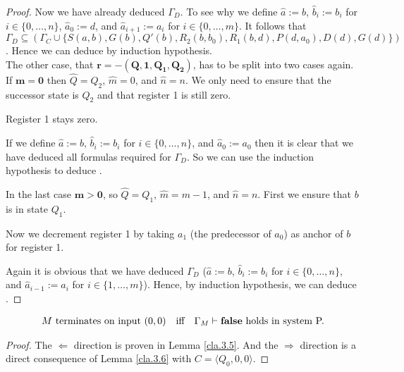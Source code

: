 \begin{proof}
	Now we have already deduced $\Gamma_D$. To see why we define $\widehat{a}:=b$, $\widehat{b}_i:=b_i$ for $i\in\{0,\dots,n\}$, $\widehat{a}_0:=d$, and $\widehat{a}_{i+1}:=a_i$ for $i\in\{0,\dots,m\}$. It follows that $\Gamma_D\subseteq(\Gamma_C\cup\{S(a,b),G(b),Q'(b),R_2(b,b_0),R_1(b,d),P(d,a_0),D(d),G(d)\})$.
	Hence we can deduce \false{} by induction hypothesis.\\
	
	The other case, that $\boldsymbol{r=-(Q,1,Q_1,Q_2)}$, has to be split into two cases again. If $\boldsymbol{m=0}$ then $\widehat{Q}=Q_2$, $\widehat{m}=0$, and $\widehat{n}=n$. We only need to ensure that the successor state is $Q_2$ and that register 1 is still zero.
	
	\begin{figure}[H]
		\centering
		
	\end{figure}
	
	Register 1 stays zero.
	
	\begin{figure}[H]
		\centering
		
	\end{figure}
	
	If we define $\widehat{a}:=b$, $\widehat{b}_i:=b_i$ for $i\in\{0,\dots,n\}$, and $\widehat{a}_0:=a_0$ then it is clear that we have deduced all formulas required for $\Gamma_D$. So we can use the induction hypothesis to deduce \false{}.
	
	In the last case $\boldsymbol{m>0}$, so $\widehat{Q}=Q_1$, $\widehat{m}=m-1$, and $\widehat{n}=n$. First we ensure that $b$ is in state $Q_1$.
	
	\begin{figure}[H]
		\centering
		
	\end{figure}
	
	Now we decrement register 1 by taking $a_1$ (the predecessor of $a_0$) as anchor of $b$ for register 1.
	
	\begin{figure}[H]
		\centering
		
	\end{figure}
	
	Again it is obvious that we have deduced $\Gamma_D$ ($\widehat{a}:=b$, $\widehat{b}_i:=b_i$ for $i\in\{0,\dots,n\}$, and $\widehat{a}_{i-1}:=a_i$ for $i\in\{1,\dots,m\}$). Hence, by induction hypothesis, we can deduce \false{}.
\end{proof}

\begin{lemma}\label{lem.3.7}
	\begin{align*} %
		  & \text{$M$ terminates on input $(0,0)$} &   & \text{iff} & \text{$\Gamma_M\PModels\false$ holds in system P.} 
	\end{align*}
\end{lemma}
\begin{proof}
	The $\Leftarrow$ direction is proven in Lemma \ref{cla.3.5}. And the $\Rightarrow$ direction is a direct consequence of Lemma \ref{cla.3.6} with $C=\langle Q_0,0,0\rangle$.
\end{proof}


